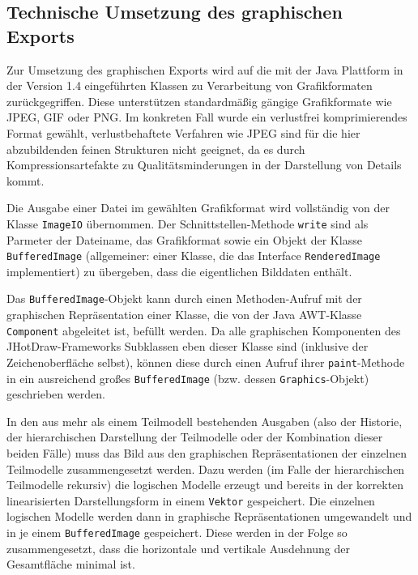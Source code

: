 
\subsection{Technische Umsetzung des graphischen Exports} %
\label{sub:technische_umsetzung_des_graphischen_exports}

Zur Umsetzung des graphischen Exports wird auf die mit der Java Plattform in der Version 1.4 eingeführten Klassen zu Verarbeitung von Grafikformaten zurückgegriffen. Diese unterstützen standardmäßig gängige Grafikformate wie \gls{JPEG}, \gls{GIF} oder \gls{PNG}. Im konkreten Fall wurde ein verlustfrei komprimierendes Format gewählt, verlustbehaftete Verfahren wie \gls{JPEG} sind für die hier abzubildenden feinen Strukturen nicht geeignet, da es durch Kompressionsartefakte zu Qualitätsminderungen in der Darstellung von Details kommt.

Die Ausgabe einer Datei im gewählten Grafikformat wird vollständig von der Klasse \texttt{ImageIO} übernommen. Der Schnittstellen-Methode \texttt{write} sind als Parmeter der Dateiname, das Grafikformat sowie ein Objekt der Klasse \texttt{BufferedImage} (allgemeiner: einer Klasse, die das Interface \texttt{RenderedImage} implementiert) zu übergeben, dass die eigentlichen Bilddaten enthält.

Das \texttt{BufferedImage}-Objekt kann durch einen Methoden-Aufruf mit der graphischen Repräsentation einer Klasse, die von der Java \gls{AWT}-Klasse \texttt{Component} abgeleitet ist, befüllt werden. Da alle graphischen Komponenten des JHotDraw-Frameworks Subklassen eben dieser Klasse sind (inklusive der Zeichenoberfläche selbst), können diese durch einen Aufruf ihrer \texttt{paint}-Methode in ein ausreichend großes \texttt{BufferedImage} (bzw. dessen \texttt{Graphics}-Objekt) geschrieben werden.  

In den aus mehr als einem Teilmodell bestehenden Ausgaben (also der Historie, der hierarchischen Darstellung der Teilmodelle oder der Kombination dieser beiden Fälle) muss das Bild aus den graphischen Repräsentationen der einzelnen Teilmodelle zusammengesetzt werden. Dazu werden (im Falle der hierarchischen Teilmodelle rekursiv) die logischen Modelle erzeugt und bereits in der korrekten linearisierten Darstellungsform in einem \texttt{Vektor} gespeichert. Die einzelnen logischen Modelle werden dann in graphische Repräsentationen umgewandelt und in je einem \texttt{BufferedImage} gespeichert. Diese werden in der Folge so zusammengesetzt, dass die horizontale und vertikale Ausdehnung der Gesamtfläche minimal ist.

